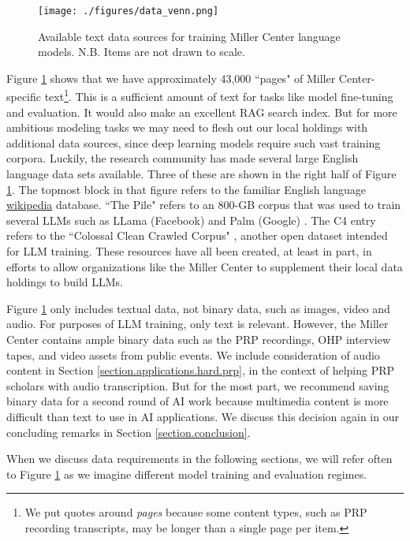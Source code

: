 \documentclass[12pt, oneside]{article}   	%
\begin{document}
\begin{figure}[htbp]
\begin{center}
\texttt{[image: ./figures/data\_venn.png]}
\caption{Available text data sources for training Miller Center language models. N.B. Items are not drawn to scale.}
\label{figure.data_venn}
\end{center}
\end{figure}

Figure \ref{figure.data_venn} shows that we have approximately 43,000 ``pages" of Miller Center-specific text\footnote{We put quotes around \emph{pages} because some content types, such as PRP recording transcripts, may be longer than a single page per item.}.  This is a sufficient amount of text for tasks like model fine-tuning and evaluation.  It would also make an excellent RAG search index.  But for more ambitious modeling tasks we may need to flesh out our local holdings with additional data sources, since deep learning models require such vast training corpora.  Luckily, the research community has made several large English language data sets available.  Three of these are shown in the right half of Figure \ref{figure.data_venn}.  The topmost block in that figure refers to the familiar English language \href{en.wikipedia.org}{wikipedia} database.  ``The Pile" refers to an 800-GB corpus that was used to train several LLMs such as LLama (Facebook) and Palm (Google) \cite{pile:2020}.  The C4 entry refers to the ``Colossal Clean Crawled Corpus" \cite{c4:2021}, another open dataset intended for LLM training.  These resources have all been created, at least in part, in efforts to allow organizations like the Miller Center to supplement their local data holdings to build LLMs.  

Figure \ref{figure.data_venn} only includes textual data, not binary data, such as images, video and audio.  For purposes of LLM training, only text is relevant.  However, the Miller Center contains ample binary data such as the PRP recordings, OHP interview tapes, and video assets from public events.  We include consideration of audio content in Section \ref{section.applications.hard.prp}, in the context of helping PRP scholars with audio transcription.  But for the most part, we recommend saving binary data for a second round of AI work because multimedia content is more difficult than text to use in AI applications.  We discuss this decision again in our concluding remarks in Section \ref{section.conclusion}.

When we discuss data requirements in the following sections, we will refer often to Figure \ref{figure.data_venn} as we imagine different model training and evaluation regimes.
\end{document}
